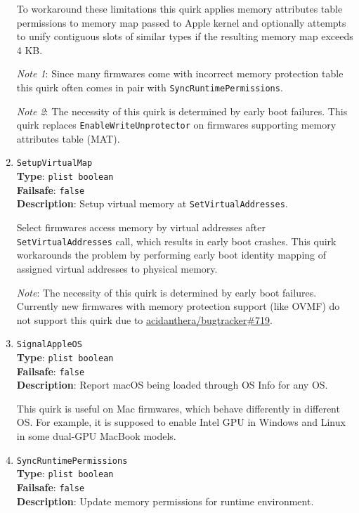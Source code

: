 \documentclass[]{article}
\begin{document}
\begin{enumerate}
  To workaround these limitations this quirk applies memory attributes table
  permissions to memory map passed to Apple kernel and optionally attempts
  to unify contiguous slots of similar types if the resulting memory map exceeds
  4 KB.

  \emph{Note 1}: Since many firmwares come with incorrect memory protection
  table this quirk often comes in pair with \texttt{SyncRuntimePermissions}.

  \emph{Note 2}: The necessity of this quirk is determined by early boot failures.
  This quirk replaces \texttt{EnableWriteUnprotector} on firmwares supporting
  memory attributes table (MAT).

\item
  \texttt{SetupVirtualMap}\\
  \textbf{Type}: \texttt{plist\ boolean}\\
  \textbf{Failsafe}: \texttt{false}\\
  \textbf{Description}: Setup virtual memory at \texttt{SetVirtualAddresses}.

  Select firmwares access memory by virtual addresses after \texttt{SetVirtualAddresses}
  call, which results in early boot crashes. This quirk workarounds the problem by
  performing early boot identity mapping of assigned virtual addresses to physical
  memory.

  \emph{Note}: The necessity of this quirk is determined by early boot failures. Currently
  new firmwares with memory protection support (like OVMF) do not support this quirk due to
  \href{https://github.com/acidanthera/bugtracker/issues/719}{acidanthera/bugtracker\#719}.

\item
  \texttt{SignalAppleOS}\\
  \textbf{Type}: \texttt{plist\ boolean}\\
  \textbf{Failsafe}: \texttt{false}\\
  \textbf{Description}: Report macOS being loaded through OS Info for any OS.

  This quirk is useful on Mac firmwares, which behave differently in different OS.
  For example, it is supposed to enable Intel GPU in Windows and Linux in some
  dual-GPU MacBook models.

\item
  \texttt{SyncRuntimePermissions}\\
  \textbf{Type}: \texttt{plist\ boolean}\\
  \textbf{Failsafe}: \texttt{false}\\
  \textbf{Description}: Update memory permissions for runtime environment.


\end{enumerate}
\end{document}
